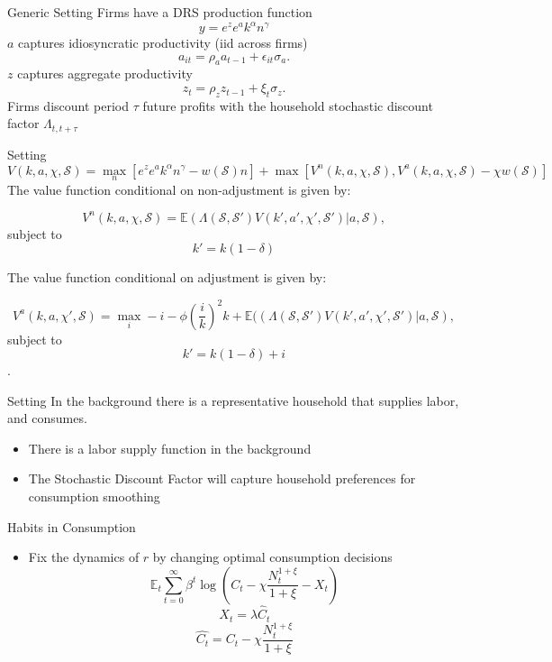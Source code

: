 \documentclass[english,xcolor=svgnames,aspectratio=169]{beamer}
\begin{document}
\begin{frame}{Generic Setting}
Firms have a DRS production function
$$y = e^z e^{a} k^{\alpha} n^{\gamma}$$
$a$ captures idiosyncratic productivity (iid across firms)
$$a_{it} = \rho_a a_{t-1} + \epsilon_{it} \sigma_a.$$
$z$ captures aggregate productivity
$$z_{t} = \rho_z z_{t-1} + \xi_{t} \sigma_z.$$
Firms discount period $\tau$ future profits with the household stochastic discount factor $\Lambda_{t,t+\tau}$
\end{frame}


\begin{frame}{Setting}
$$V(k,a,\chi,\mathcal{S}) = \max_n \left[e^z e^{a} k^{\alpha} n^{\gamma} - w(\mathcal{S}) n\right] + \max \left[V^n(k,a,\chi, \mathcal{S}),V^a(k,a,\chi,\mathcal{S}) - \chi w(\mathcal{S}) \right]$$ \vspace{-0.5cm}
The value function conditional on non-adjustment is given by:

$$V^n(k,a,\chi,\mathcal{S}) = \mathbb{E}(\Lambda(\mathcal{S},\mathcal{S'}) V(k',a',\chi',\mathcal{S'})|a,\mathcal{S}),$$ subject to $$k' = k(1-\delta)$$ \vspace{-0.5cm}

The value function conditional on adjustment is given by:

$$V^a(k,a,\chi',\mathcal{S}) = \max_i - i -\phi \left(\frac{i}{k}\right)^2 k +  \mathbb{E}((\Lambda(\mathcal{S},\mathcal{S'}) V(k',a',\chi',\mathcal{S'})|a,\mathcal{S}),$$ subject to $$k' = k(1-\delta) + i$$. \vspace{-0.5cm}
\end{frame}

\begin{frame}{Setting}
In the background there is a representative household that supplies labor, and consumes.
\begin{itemize}
\item There is a labor supply function in the background
\item The Stochastic Discount Factor will capture household preferences for consumption smoothing
\end{itemize}
\end{frame}



\begin{frame}{Habits in Consumption}
\begin{itemize}
\item Fix the dynamics of $r$ by changing optimal consumption decisions
$$\mathbb{E}_t \sum_{t=0}^{\infty} \beta^t \log\left(C_t - \chi \frac{N^{1+\xi}_t}{1+\xi} - X_t \right)$$
$$X_t = \lambda \hat{C}_t$$
$$\hat{C_t} = C_t - \chi \frac{N^{1+\xi}_t}{1+\xi}$$
\end{itemize}
\end{frame}
\end{document}
